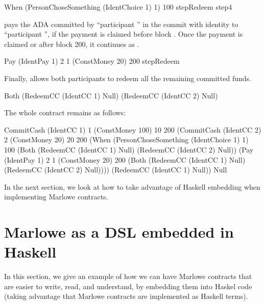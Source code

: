 \documentclass[
      acmsmall
    , screen
  ]{acmart}
\begin{document}
\begin{haskellcode}
When (PersonChoseSomething (IdentChoice 1) 1) 100
     stepRedeem
     step4
\end{haskellcode}

 pays the  ADA committed by ``participant '' in the commit with 
identity  to ``participant '', if the payment is claimed before block 
. Once the payment is claimed or after block 200, it continues as .

\begin{haskellcode}
Pay (IdentPay 1) 2 1 (ConstMoney 20) 200 stepRedeem
\end{haskellcode}

Finally,  allows both participants to redeem all the remaining committed funds.

\begin{haskellcode}
Both (RedeemCC (IdentCC 1) Null)
     (RedeemCC (IdentCC 2) Null)
\end{haskellcode}

The whole contract remains as follows:
\begin{haskellcode}
CommitCash (IdentCC 1) 1
           (ConstMoney 100)
           10 200
           (CommitCash (IdentCC 2) 2
                       (ConstMoney 20)
                       20 200
                       (When (PersonChoseSomething (IdentChoice 1) 1)
                             100
                             (Both (RedeemCC (IdentCC 1) Null)
                                   (RedeemCC (IdentCC 2) Null))
                             (Pay (IdentPay 1) 2 1
                                  (ConstMoney 20)
                                  200
                                  (Both (RedeemCC (IdentCC 1) Null)
                                        (RedeemCC (IdentCC 2) Null))))
                       (RedeemCC (IdentCC 1) Null))
           Null
\end{haskellcode}

In the next section, we look at how to take advantage of Haskell embedding when implementing Marlowe contracts.

\section{Marlowe as a DSL embedded in Haskell}
\label{section:example-escrow}

In this section, we give an example of how we can have Marlowe contracts that are easier to write, read, and 
understand, by embedding them into Haskel code (taking advantage that Marlowe contracts are implemented as Haskell 
terms).
\end{document}
